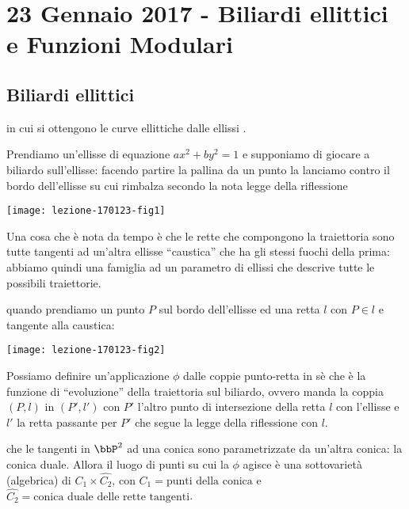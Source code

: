 \chapter{23 Gennaio 2017 - Biliardi ellittici e Funzioni Modulari}
\justify

\section{Biliardi ellittici}
 in cui si ottengono le curve
ellittiche dalle ellissi .

Prendiamo un'ellisse di equazione $ax^2 + by^2 = 1$ e supponiamo di
giocare a biliardo sull'ellisse: facendo partire la pallina da un punto
la lanciamo contro il bordo dell'ellisse su cui rimbalza secondo la nota
legge della riflessione 

\begin{center}
  \texttt{[image: lezione-170123-fig1]}
\end{center}
  
Una cosa che è nota da tempo è che le rette che compongono la
traiettoria sono tutte tangenti ad un'altra ellisse ``caustica'' che ha
gli stessi fuochi della prima: abbiamo quindi una famiglia ad un
parametro di ellissi che descrive tutte le possibili traiettorie.

 quando prendiamo un punto $P$
sul bordo dell'ellisse ed una retta $l$ con $P \in l$ e tangente alla
caustica:

\texttt{[image: lezione-170123-fig2]}

Possiamo definire un'applicazione $\phi$ dalle coppie punto-retta in sè
che è la funzione di ``evoluzione'' della traiettoria sul biliardo,
ovvero manda la coppia $(P, l)$ in $(P', l')$ con $P'$ l'altro punto di
intersezione della retta $l$ con l'ellisse e $l'$ la retta passante per
$P'$ che segue la legge della riflessione con $l$.

 che le tangenti in $\bbP^2$ ad una conica sono
parametrizzate da un'altra conica: la conica duale.
Allora il luogo di punti su cui la $\phi$ agisce è una sottovarietà
(algebrica) di $C_1 \times \hat{C_2}$, con $C_1 = \text{punti della
  conica}$ e $\hat{C_2} = \text{conica duale delle rette tangenti}$.


